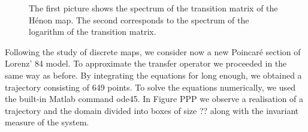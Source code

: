 \begin{figure}[H]
\begin{subfigure}[b]{0.4\textwidth}
		\label{fig:tiger}
	\end{subfigure}
	\caption{The first picture shows the spectrum of the transition matrix of the H\'{e}non map. The second corresponds to the spectrum of the logarithm of the transition matrix.}
\end{figure}

Following the study of discrete maps, we consider now a new Poincaré section of Lorenz' 84 model. To approximate the transfer operator we proceeded in the same way as before. By integrating the equations for long enough, we obtained a trajectory consisting of 649 points. To solve the equations numerically, we used the built-in Matlab command ode45. In Figure PPP we observe a realisation of a trajectory and the domain divided into boxes of size ?? along with the invariant measure of the system. 

